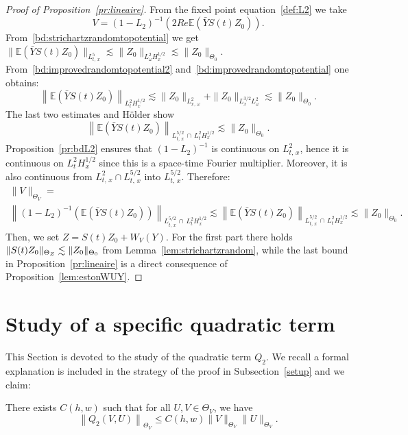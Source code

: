 \documentclass[10pt]{amsart}
\theoremstyle{definition}\newtheorem{defi}[theo]{Definition}\newtheorem{rema}[theo]{Remark}\newtheorem{exam}[theo]{Example}\newtheorem{exem}[theo]{Example}\newtheorem{nota}[theo]{Notation}
\newcommand{\E}{\mathbb{E}}
\begin{document}
\begin{proof}[Proof of Proposition~\ref{pr:lineaire}]
From the fixed point equation~\eqref{def:L2} we take
\[
V=(1-L_2)^{-1}\left(2Re\E\left(\bar Y S(t)Z_0\right)\right).
\]
From~\eqref{bd:strichartzrandomtopotential} we get $\|\E(\bar Y S(t)Z_0)\|_{L^{5}_{t,\,x}}\lesssim \| Z_0 \|_{L^2_\omega H^{1/2}_x}\lesssim \| Z_0 \|_{\Theta_0}$. From~\eqref{bd:improvedrandomtopotential2} and~\eqref{bd:improvedrandomtopotential} one obtains:
\[
\left\|\E\left(\bar Y S(t)Z_0\right)\right\|_{L^2_tH^{1/2}_x}\lesssim \| Z_0 \|_{L^2_{x,\,\omega}}+\| Z_0 \|_{L^{3/2}_xL^2_\omega}\lesssim \| Z_0 \|_{\Theta_0}.
\]
The last two estimates and H\"older show
\[
\left\|\E\left(\bar Y S(t)Z_0\right)\right\|_{L^{5/2}_{t,\,x}\,\cap\,L^2_tH^{1/2}_x}\lesssim \| Z_0 \|_{\Theta_0}.
\]
Proposition~\ref{pr:bdL2} ensures that $(1-L_2)^{-1}$ is continuous on $L^{2}_{t,\,x}$, hence it is continuous on $L^2_{t}H^{1/2}_x$ since this is a space-time Fourier multiplier. Moreover, it is also continuous from $L^{2}_{t,\,x}\cap L^{5/2}_{t,\,x}$ into $L^{5/2}_{t,\,x}$. Therefore:
\begin{multline*}
\| V\|_{\Theta_V}=\\
\left\| (1-L_2)^{-1}\left(\E\left(\bar Y S(t)Z_0\right)\right)\right\|_{L^{5/2}_{t,\,x}\,\cap\,L^2_{t}H^{1/2}_x}\lesssim \left\|\E\left(\bar Y S(t)Z_0\right)\right\|_{L^{5/2}_{t,\,x}\,\cap\,L^2_{t}H^{1/2}_x} \lesssim \| Z_0 \|_{\Theta_0}.
\end{multline*}
Then, we set $Z=S(t)Z_0+W_V(Y)$. For the first part there holds $\| S(t)Z_0\|_{\Theta_Z}\linebreak\lesssim \| Z_0 \|_{\Theta_0}$ from Lemma~\ref{lem:strichartzrandom}, while the last bound in Proposition~\ref{pr:lineaire} is a direct consequence of Proposition~\ref{lem:estonWUY}.
\end{proof}



\section{Study of a specific quadratic term}\label{sec:spefquad}

This Section is devoted to the study of the quadratic term $Q_2$. We recall a formal explanation is included in the strategy of the proof in Subsection~\ref{setup} and we claim:

\begin{prop}\label{pr:continuiteQ2}
There exists $C(h,w)$ such that for all $U,V \in \Theta_V$, we have
\[
\left\|Q_2(V,U)\right\|_{\Theta_V} \leq C(h,w) \|V\|_{\Theta_V} \|U\|_{\Theta_V}.
\]
\end{prop}
\end{document}
